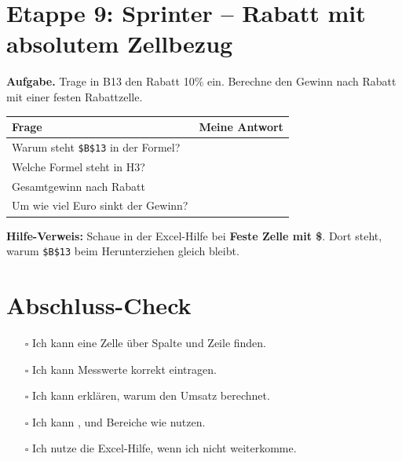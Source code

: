 \section*{Etappe 9: Sprinter -- Rabatt mit absolutem Zellbezug}
\begin{boxHinweis}
\textbf{Aufgabe.} Trage in B13 den Rabatt 10\% ein. Berechne den Gewinn nach Rabatt mit einer festen Rabattzelle.
\end{boxHinweis}

\begin{tabularx}{\textwidth}{|L{5cm}|Y|}
\hline
{}\textbf{Frage} & \textbf{Meine Antwort}\\\hline
Warum steht \texttt{\$B\$13} in der Formel? & \\\hline
Welche Formel steht in H3? & \\\hline
Gesamtgewinn nach Rabatt & \\\hline
Um wie viel Euro sinkt der Gewinn? & \\\hline
\end{tabularx}

\begin{boxTipp}
\textbf{Hilfe-Verweis:} Schaue in der Excel-Hilfe bei \textbf{Feste Zelle mit \$}. Dort steht, warum \texttt{\$B\$13} beim Herunterziehen gleich bleibt.
\end{boxTipp}

\section*{Abschluss-Check}
\begin{boxK}
\begin{itemize}
\item[$\square$] Ich kann eine Zelle über Spalte und Zeile finden.
\item[$\square$] Ich kann Messwerte korrekt eintragen.
\item[$\square$] Ich kann erklären, warum  den Umsatz berechnet.
\item[$\square$] Ich kann ,  und Bereiche wie  nutzen.
\item[$\square$] Ich nutze die Excel-Hilfe, wenn ich nicht weiterkomme.
\end{itemize}
\end{boxK}

